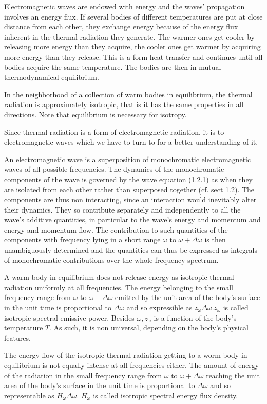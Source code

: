 \documentclass{article}
\begin{document}
Electromagnetic waves are endowed with energy and the waves' propagation involves an energy flux. If several bodies of different temperatures are put at close distance from each other, they exchange energy because of the energy flux inherent in the thermal radiation they generate. The warmer ones get cooler by releasing more energy than they acquire, the cooler ones get warmer by acquiring more energy than they release. This is a form heat transfer and continues until all bodies acquire the same temperature. The bodies are then in mutual thermodynamical equilibrium.

In the neighborhood of a collection of warm bodies in equilibrium, the thermal radiation is approximately isotropic, that is it has the same properties in all directions. Note that equilibrium is necessary for isotropy.

Since thermal radiation is a form of electromagnetic radiation, it is to electromagnetic waves which we have to turn to for a better understanding of it.

An electromagnetic wave is a superposition of monochromatic electromagnetic waves of all possible frequencies. The dynamics of the monochromatic components of the wave is governed by the wave equation (1.2.1) as when they are
isolated from each other rather than superposed together (cf. sect 1.2). The components are thus non interacting, since an interaction would inevitably alter their dynamics. They so contribute separately and independently to all the wave's additive quantities, in particular to the wave's energy and momentum and energy and momentum flow. The contribution to such quantities of the components with frequency lying in a short range $\omega$ to $\omega+\Delta \omega$ is then unambiguously determined and the quantities can thus be expressed as integrals of monochromatic contributions over the whole frequency spectrum.

A warm body in equilibrium does not release energy as isotropic thermal radiation uniformly at all frequencies. The energy belonging to the small frequency range from $\omega$ to $\omega+\Delta \omega$ emitted by the unit area of the body's surface in the unit time is proportional to $\Delta \omega$ and so expressible as $z_{\omega} \Delta \omega . z_{\omega}$ is called isotropic spectral emissive power. Besides $\omega, z_{\omega}$ is a function of the body's temperature $T$. As such, it is non universal, depending on the body's physical features.

The energy flow of the isotropic thermal radiation getting to a worm body in equilibrium is not equally intense at all frequencies either. The amount of energy of the radiation in the small frequency range from $\omega$ to $\omega+\Delta \omega$ reaching the unit area of the body's surface in the unit time is proportional to $\Delta \omega$ and so representable as $H_{\omega} \Delta \omega$. $H_{\omega}$ is called isotropic spectral energy flux density.
\end{document}
